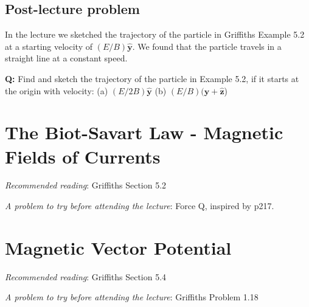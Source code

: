 \documentclass[
  letterpaper,
  DIV=11,
  numbers=noendperiod]{scrreprt}
\begin{document}
\section{Post-lecture problem}\label{post-lecture-problem}

In the lecture we sketched the trajectory of the particle in Griffiths
Example 5.2 at a starting velocity of
\((E/B) \hat{\mathrm{\mathbf{y}}}\). We found that the particle travels
in a straight line at a constant speed.

\textbf{Q:} Find and sketch the trajectory of the particle in Example
5.2, if it starts at the origin with velocity: (a)
\((E/2B) \hat{\mathrm{\mathbf{y}}}\) (b)
\((E/B) (\hat{\mathrm{\mathbf{y}}} + \hat{\mathrm{\mathbf{z}}}\))


\chapter{The Biot-Savart Law - Magnetic Fields of
Currents}\label{the-biot-savart-law---magnetic-fields-of-currents}

\newcommand{\l}{\mathrm{\mathbf{l}}}
\newcommand{\E}{\mathrm{\mathbf{E}}}
\newcommand{\F}{\mathrm{\mathbf{F}}}
\newcommand{\r}{\mathrm{\mathbf{r}}}

\newcommand{\x}{\mathrm{\mathbf{x}}}
\newcommand{\y}{\mathrm{\mathbf{y}}}
\newcommand{\z}{\mathrm{\mathbf{z}}}

\emph{Recommended reading}: Griffiths Section 5.2

\emph{A problem to try before attending the lecture}: Force Q, inspired
by p217.


\chapter{Magnetic Vector Potential}\label{magnetic-vector-potential}

\newcommand{\l}{\mathrm{\mathbf{l}}}
\newcommand{\E}{\mathrm{\mathbf{E}}}
\newcommand{\F}{\mathrm{\mathbf{F}}}
\newcommand{\r}{\mathrm{\mathbf{r}}}

\newcommand{\x}{\mathrm{\mathbf{x}}}
\newcommand{\y}{\mathrm{\mathbf{y}}}
\newcommand{\z}{\mathrm{\mathbf{z}}}

\emph{Recommended reading}: Griffiths Section 5.4

\emph{A problem to try before attending the lecture}: Griffiths Problem
1.18
\end{document}
